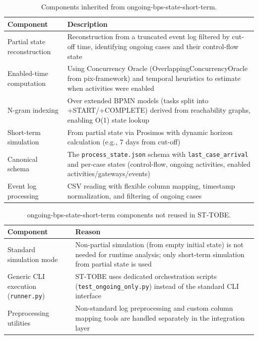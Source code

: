 \documentclass[a4paper,fleqn]{cas-sc}
\begin{document}
\begin{table}[width=.95\linewidth,cols=2,pos=t]
\caption{Components inherited from ongoing-bps-state-short-term.}
\label{tbl:inherited_ongoing}
\begin{tabular*}{\tblwidth}{@{} p{} p{} @{}}
\toprule
Component & Description \\
\midrule
Partial state reconstruction & Reconstruction from a truncated event log filtered by cut-off time, identifying ongoing cases and their control-flow state \\
Enabled-time computation & Using Concurrency Oracle (OverlappingConcurrencyOracle from pix-framework) and temporal heuristics to estimate when activities were enabled \\
N-gram indexing & Over extended BPMN models (tasks split into +START/+COMPLETE) derived from reachability graphs, enabling O(1) state lookup \\
Short-term simulation & From partial state via Prosimos with dynamic horizon calculation (e.g., 7 days from cut-off) \\
Canonical schema & The \verb|process_state.json| schema with \verb|last_case_arrival| and per-case states (control-flow, ongoing activities, enabled activities/gateways/events) \\
Event log processing & CSV reading with flexible column mapping, timestamp normalization, and filtering of ongoing cases \\
\bottomrule
\end{tabular*}
\end{table}

\begin{table}[width=.95\linewidth,cols=2,pos=t]
\caption{ongoing-bps-state-short-term components not reused in ST-TOBE.}
\label{tbl:not_reused_ongoing}
\begin{tabular*}{\tblwidth}{@{} p{} p{} @{}}
\toprule
Component & Reason \\
\midrule
Standard simulation mode & Non-partial simulation (from empty initial state) is not needed for runtime analysis; only short-term simulation from partial state is used \\
Generic CLI execution (\verb|runner.py|) & ST-TOBE uses dedicated orchestration scripts (\verb|test_ongoing_only.py|) instead of the standard CLI interface \\
Preprocessing utilities & Non-standard log preprocessing and custom column mapping tools are handled separately in the integration layer \\
\bottomrule
\end{tabular*}
\end{table}
\end{document}
